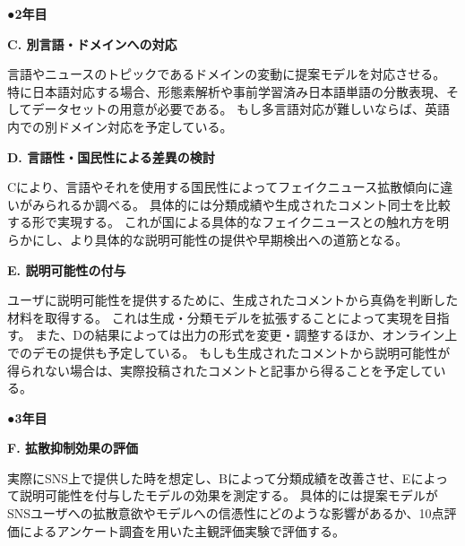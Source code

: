 {	%


	\noindent
	●\textbf{2年目}

	\noindent
	\textbf{C. 別言語・ドメインへの対応}

	言語やニュースのトピックであるドメインの変動に提案モデルを対応させる。
	特に日本語対応する場合、形態素解析や事前学習済み日本語単語の分散表現、そしてデータセットの用意が必要である。
	もし多言語対応が難しいならば、英語内での別ドメイン対応を予定している。

	\noindent
	\textbf{D. 言語性・国民性による差異の検討}

	Cにより、言語やそれを使用する国民性によってフェイクニュース拡散傾向に違いがみられるか調べる。
	具体的には分類成績や生成されたコメント同士を比較する形で実現する。
	これが国による具体的なフェイクニュースとの触れ方を明らかにし、より具体的な説明可能性の提供や早期検出への道筋となる。

	\noindent
	\textbf{E. 説明可能性の付与}

	ユーザに説明可能性を提供するために、生成されたコメントから真偽を判断した材料を取得する。
	これは生成・分類モデルを拡張することによって実現を目指す。
	また、Dの結果によっては出力の形式を変更・調整するほか、オンライン上でのデモの提供も予定している。
	もしも生成されたコメントから説明可能性が得られない場合は、実際投稿されたコメントと記事から得ることを予定している。

	\noindent
	●\textbf{3年目}

	\noindent
	\textbf{F. 拡散抑制効果の評価}

	実際にSNS上で提供した時を想定し、Bによって分類成績を改善させ、Eによって説明可能性を付与したモデルの効果を測定する。
	具体的には提案モデルがSNSユーザへの拡散意欲やモデルへの信憑性にどのような影響があるか、10点評価によるアンケート調査を用いた主観評価実験で評価する。

}

